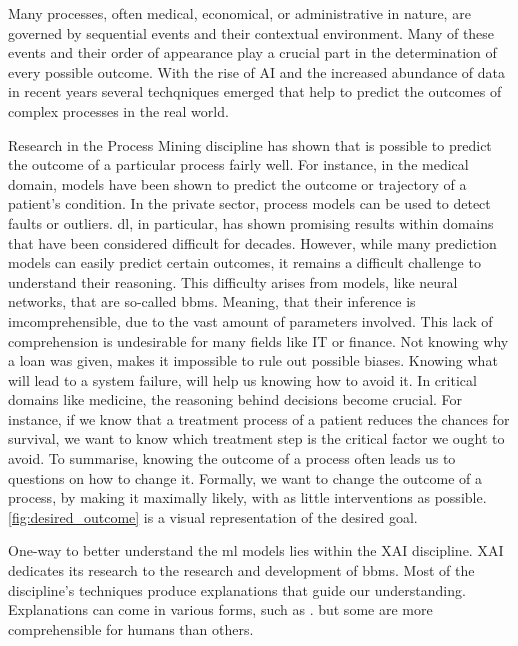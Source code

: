 \documentclass[./../../paper.tex]{subfiles}
\begin{document}
Many processes, often medical, economical, or administrative in nature, are governed by sequential events and their contextual environment. Many of these events and their order of appearance play a crucial part in the determination of every possible outcome. With the rise of AI and the increased abundance of data in recent years several techqniques emerged that help to predict the outcomes of complex processes in the real world. 

Research in the Process Mining discipline has shown that is possible to predict the outcome of a particular process fairly well\needscite{}. 
For instance, in the medical domain, models have been shown to predict the outcome or trajectory of a patient's condition\needscite{}. In the private sector, process models can be used to detect faults or outliers. \gls{dl}, in particular, has shown promising results within domains that have been considered difficult for decades. However, while many prediction models can easily predict certain outcomes, it remains a difficult challenge to understand their reasoning. This difficulty arises from models, like neural networks, that are so-called \glspl{bbm}. Meaning, that their inference is imcomprehensible, due to the vast amount of parameters involved. This lack of comprehension is undesirable for many fields like IT or finance. Not knowing why a loan was given, makes it impossible to rule out possible biases. Knowing what will lead to a system failure, will help us knowing how to avoid it. In critical domains like medicine, the reasoning behind decisions become crucial. For instance, if we know that a treatment process of a patient reduces the chances for survival, we want to know which treatment step is the critical factor we ought to avoid. To summarise, knowing the outcome of a process often leads us to questions on how to change it. Formally, we want to change the outcome of a process, by making it maximally likely, with as little interventions as possible\needscite{}. \autoref{fig:desired_outcome} is a visual representation of the desired goal.


One-way to better understand the \gls{ml} models lies within the \gls{XAI} discipline. \gls{XAI} dedicates its research to the research and development of \glspl{bbm}. Most of the discipline's techniques produce explanations that guide our understanding. Explanations can come in various forms, such as \needscite{}. but some are more comprehensible for humans than others. 
\end{document}
